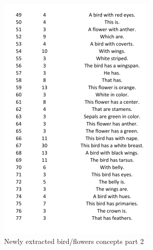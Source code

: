 \begin{figure}[h]
\caption{Newly extracted bird/flowers concepts part 2}
\centering
\includegraphics[width=\textwidth]{appendix/birds_new2.png}
\end{figure}


